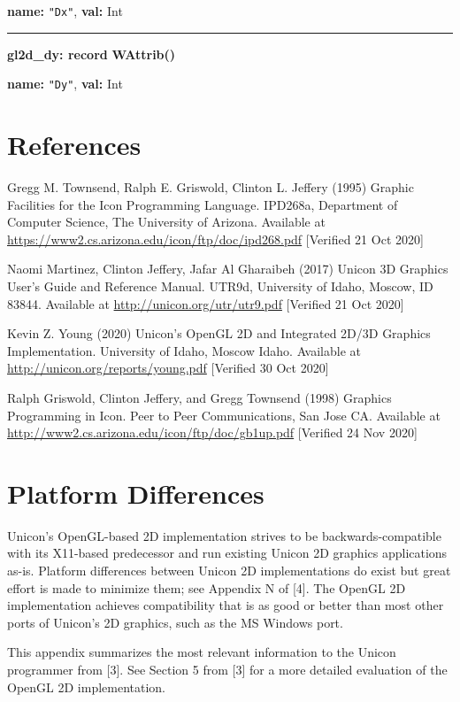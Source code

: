 \documentclass[letterpaper,12pt]{article}
\begin{document}
{\bf name:} \texttt{"Dx"},\newline\indent
{\bf val:} Int

\bigskip\hrule\vspace{0.1cm}
\noindent
{\bf gl2d\_dy: record} \hfill {\bf WAttrib()}

{\bf name:} \texttt{"Dy"},\newline\indent
{\bf val:} Int

\newpage
\section{References}

\noindent
[1] Gregg M. Townsend, Ralph E. Griswold, Clinton L. Jeffery (1995) Graphic Facilities for the Icon Programming Language. IPD268a, Department of Computer Science, The University of Arizona. Available at \url{https://www2.cs.arizona.edu/icon/ftp/doc/ipd268.pdf} [Verified 21 Oct 2020]

\bigskip\noindent
[2] Naomi Martinez, Clinton Jeffery, Jafar Al Gharaibeh (2017) Unicon 3D Graphics User's Guide and Reference Manual. UTR9d, University of Idaho, Moscow, ID 83844. Available at \url{http://unicon.org/utr/utr9.pdf} [Verified 21 Oct 2020]

\bigskip\noindent
[3] Kevin Z. Young (2020) Unicon's OpenGL 2D and Integrated 2D/3D Graphics Implementation. University of Idaho, Moscow Idaho. Available at \url{http://unicon.org/reports/young.pdf} [Verified 30 Oct 2020]

\bigskip\noindent
[4] Ralph Griswold, Clinton Jeffery, and Gregg Townsend (1998)
Graphics Programming in Icon. Peer to Peer Communications, San Jose CA. Available at \url{http://www2.cs.arizona.edu/icon/ftp/doc/gb1up.pdf} [Verified 24 Nov 2020]

\newpage
\appendix
\section{Platform Differences}

Unicon's OpenGL-based 2D implementation strives to be backwards-compatible
with its X11-based predecessor and run existing Unicon 2D graphics 
applications as-is.
Platform differences between Unicon 2D implementations do exist but
great effort is made to minimize them; see Appendix N of [4].
The OpenGL 2D implementation achieves compatibility that is as good or
better than most other ports of Unicon's 2D graphics, such as the MS
Windows port.

This appendix summarizes the most relevant information to the Unicon
programmer from [3]. See Section 5 from [3] for a more detailed
evaluation of the OpenGL 2D implementation.
\end{document}
